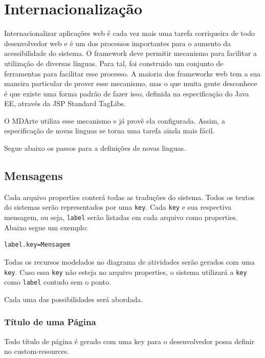 \section{Internacionalização}

Internacionalizar aplicações web é cada vez mais uma tarefa corriqueira de todo
desenvolvedor web e é um dos processos importantes para o aumento da
acessibilidade do sistema. O framework deve permitir mecanismo para facilitar a
utilização de diversas línguas. Para tal, foi construido um conjunto de
ferramentas para facilitar esse processo. A maioria dos frameworks web tem a sua
maneira particular de prover esse mecanismo, mas o que muita gente desconhece é
que existe uma forma padrão de fazer isso,  definida na especificação do Java EE, através da JSP Standard TagLibs.

O MDArte utiliza esse mecanismo e já provê ela configurada. Assim, a
especificação de novas linguas se torna uma tarefa ainda mais fácil.

Segue abaixo os passos para a definições de novas linguas.

\subsection{Mensagens}

Cada arquivo properties conterá todas as traduções do sistema. Todos os textos
do sistemas serão representados por uma \texttt{key}. Cada \texttt{key} e sua
respectiva mensagem, ou seja, \texttt{label} serão listadas em cada arquivo como
properties. Abaixo segue um exemplo:

\begin{lstlisting}[language=xml, frame=single, breaklines=true]
	label.key=Mensagem
\end{lstlisting}

Todas os recursos modelados no diagrama de atividades serão gerados com uma \texttt{key}.
Caso essa \texttt{key} não esteja no arquivo properties, o sistema utilizará a
\texttt{key} como \texttt{label} contudo sem o ponto.

Cada uma das possibilidades será abordada.

\subsubsection{Título de uma Página}

Todo título de página é gerado com uma key para o desenvolvedor possa definir no
custom-resources. 

